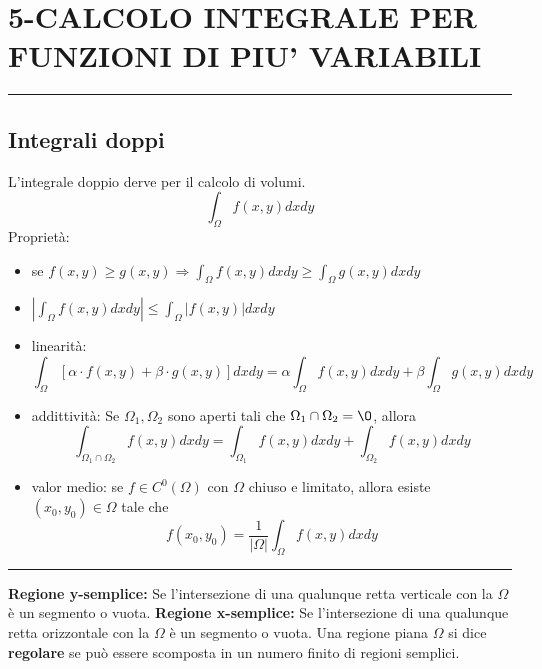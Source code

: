\section*{5-CALCOLO INTEGRALE PER FUNZIONI DI PIU' VARIABILI}
\rule{\textwidth}{2pt}
\subsection*{Integrali doppi}
L'integrale doppio derve per il calcolo di volumi.\newline
\[
    \int_{\Omega} f(x,y) dxdy
\]
Proprietà:
\begin{itemize}
    \item se $f(x,y)\geq g(x,y) \Rightarrow \int_\Omega f(x,y) dxdy \geq \int_{\Omega} g(x,y)dxdy$
    \item $|\int_{\Omega}f(x,y) dxdy| \leq \int_{\Omega}|f(x,y)|dxdy$
    \item linearità:
    \[
        \int_{\Omega}[\alpha \cdot f(x,y) + \beta \cdot g(x,y)]dxdy = \alpha \int_{\Omega} f(x,y) dxdy + \beta \int_{\Omega} g(x,y) dxdy
    \]
    \item addittività: Se $\Omega_1, \Omega_2$ sono aperti tali che $\Omega_1 \cap \Omega_2 = \O$, allora
    \[
        \int_{\Omega_1 \cap \Omega_2}f(x,y)dxdy = \int_{\Omega_1} f(x,y) dxdy + \int_{\Omega_2} f(x,y) dxdy
    \]
    \item valor medio: se $f \in C^0(\Omega)$ con $\Omega$ chiuso e limitato, allora esiste $(x_0, y_0) \in\Omega$ tale che 
    \[
        f(x_0, y_0) = \frac{1}{|\Omega|}\int_{\Omega}f(x,y)dxdy
    \]
\end{itemize}
\rule{\textwidth}{0,4pt}\newline
\textbf{Regione y-semplice:} Se l'intersezione di una qualunque retta verticale con la $\Omega$ è un segmento o vuota.\newline
\textbf{Regione x-semplice:} Se l'intersezione di una qualunque retta orizzontale con la $\Omega$ è un segmento o vuota.\newline
\newline
Una regione piana $\Omega$ si dice \textbf{regolare} se può essere scomposta in un numero finito di regioni semplici.
